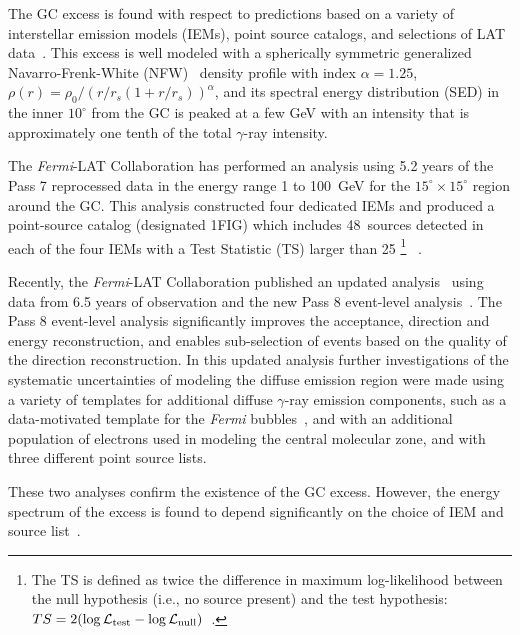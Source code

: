 \documentclass[iop]{emulateapj}
\begin{document}
The GC excess is found with respect to predictions based
  on a variety of interstellar emission models (IEMs), point source
catalogs, and selections of LAT
data~\citep[e.g.,][]{2009arXiv0910.2998G,2012PhRvD..86h3511A,
  2013PDU.....2..118H,2013PhRvD..88h3521G,Abazajian:2014fta,
  Calore:2014xka,2016PDU....12....1D}.
This excess is well modeled with a spherically symmetric generalized
Navarro-Frenk-White
(NFW)~\citep{1996ApJ...462..563N,1998ApJ...502...48K} density profile
with index $\alpha =1.25$, $\rho(r) = \rho_0/( r/r_s (1+r/r_s))^\alpha$,
 and its spectral energy distribution (SED) in the
inner $10^{\circ}$ from the GC is peaked at a few GeV with an
intensity that is approximately one tenth of the total $\gamma$-ray
intensity.

The {\it Fermi}-LAT Collaboration has performed an analysis
using 5.2 years of the Pass 7 reprocessed data in the energy range 1 to 100~GeV for the
$15^{\circ}\times15^{\circ}$ region around the GC.
This analysis constructed four dedicated IEMs 
and produced a point-source catalog (designated 1FIG) which
includes 48~sources detected in each of the four IEMs with a Test Statistic (TS) larger than
25 \footnote[1]{The TS is defined as twice the difference in maximum log-likelihood 
between the null hypothesis (i.e., no source present)
and the test hypothesis: $TS = 2 ( \log\mathcal{L}_{\rm test} -
\log\mathcal{L}_{\rm null} )$~\citep[see, e.g.,][]{1996ApJ...461..396M}.}
~\citep{2016ApJ...819...44A}.  

Recently, the {\it Fermi}-LAT Collaboration published an updated
analysis~\citep{TheFermi-LAT:2017vmf} using data from 6.5 years of observation
and the new Pass 8 event-level analysis~\citep{2013arXiv1303.3514A}.
The Pass 8 event-level analysis significantly improves the acceptance,
direction and energy reconstruction, and enables sub-selection of
events based on the quality of the direction reconstruction.
In this updated analysis further investigations of
  the systematic uncertainties of modeling the diffuse emission region
  were made using a variety of templates for additional diffuse $\gamma$-ray emission components, such as a
data-motivated template for the {\it Fermi}
bubbles~\citep{2010ApJ...724.1044S,2014ApJ...793...64A}, and with an
additional population of electrons used in modeling the central
molecular zone, and with three different point source lists.

These two analyses confirm the existence of the GC excess.  However, the
energy spectrum of the excess is found to depend significantly on the
choice of IEM and source list~\citep{2016ApJ...819...44A,TheFermi-LAT:2017vmf}.
\end{document}
